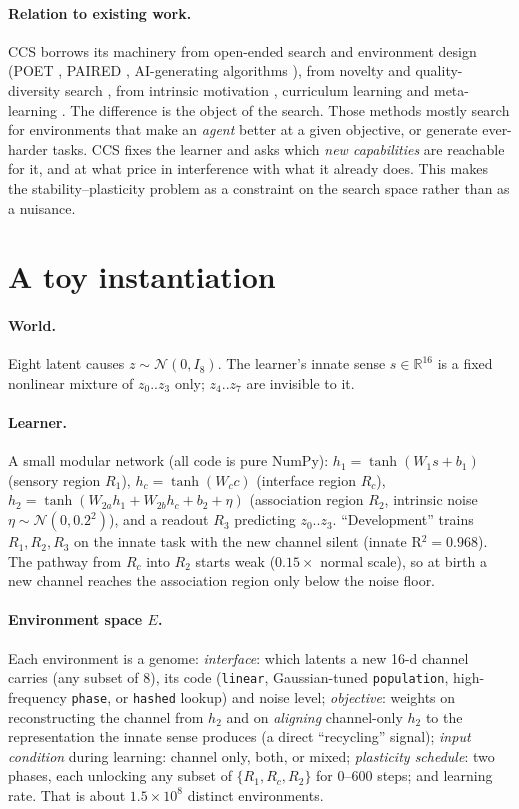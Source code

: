 \documentclass[11pt]{article}
\begin{document}
\paragraph{Relation to existing work.} CCS borrows its machinery from open-ended search and
environment design (POET \cite{wang2019poet}, PAIRED \cite{dennis2020}, AI-generating algorithms
\cite{clune2019}), from novelty and quality-diversity search \cite{lehman2011,mouret2015}, from
intrinsic motivation \cite{oudeyer2007}, curriculum learning \cite{bengio2009} and meta-learning
\cite{hospedales2022}. The difference is the object of the search. Those methods mostly search for
environments that make an \emph{agent} better at a given objective, or generate ever-harder tasks.
CCS fixes the learner and asks which \emph{new capabilities} are reachable for it, and at what
price in interference with what it already does. This makes the stability--plasticity problem
\cite{mccloskey1989,kirkpatrick2017} as a constraint on the search space rather than as a nuisance.

\section{A toy instantiation}
\paragraph{World.} Eight latent causes $z\sim\mathcal N(0,I_8)$. The learner's innate sense
$s\in\mathbb R^{16}$ is a fixed nonlinear mixture of $z_0..z_3$ only; $z_4..z_7$ are invisible to
it.

\paragraph{Learner.} A small modular network (all code is pure NumPy):
$h_1=\tanh(W_1 s+b_1)$ (sensory region $R_1$), $h_c=\tanh(W_c c)$ (interface region $R_c$),
$h_2=\tanh(W_{2a}h_1+W_{2b}h_c+b_2+\eta)$ (association region $R_2$, intrinsic noise
$\eta\sim\mathcal N(0,0.2^2)$), and a readout $R_3$ predicting $z_0..z_3$. ``Development''
trains $R_1,R_2,R_3$ on the innate task with the new channel silent (innate R$^2=0.968$). The
pathway from $R_c$ into $R_2$ starts weak ($0.15\times$ normal scale), so at birth a new channel
reaches the association region only below the noise floor.

\paragraph{Environment space $E$.} Each environment is a genome:
\emph{interface}: which latents a new 16-d channel carries (any subset of 8), its code
(\texttt{linear}, Gaussian-tuned \texttt{population}, high-frequency \texttt{phase}, or
\texttt{hashed} lookup) and noise level; \emph{objective}: weights on reconstructing the channel
from $h_2$ and on \emph{aligning} channel-only $h_2$ to the representation the innate sense
produces (a direct ``recycling'' signal); \emph{input condition} during learning: channel only,
both, or mixed; \emph{plasticity schedule}: two phases, each unlocking any subset of
$\{R_1,R_c,R_2\}$ for $0$--$600$ steps; and learning rate. That is about $1.5\times10^8$ distinct environments.
\end{document}
